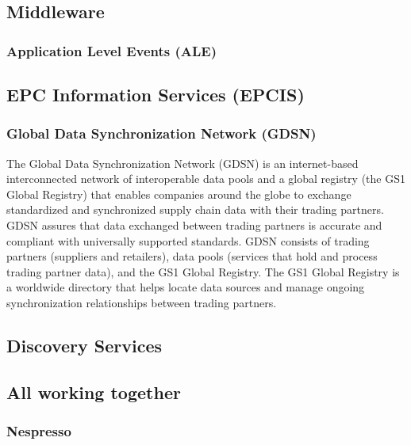 




\subsection{Middleware}

\subsubsection{Application Level Events (ALE)}

\subsection{EPC Information Services (EPCIS)}

\subsubsection{Global Data Synchronization Network (GDSN)}

The Global Data Synchronization Network (GDSN) is an internet-based
interconnected network of interoperable data pools and a global registry (the GS1 Global Registry) that enables companies around the globe to exchange standardized and synchronized supply chain data with their trading partners. GDSN assures that data exchanged between trading partners is accurate and compliant with universally supported standards. GDSN consists of trading partners (suppliers and retailers), data pools (services that hold and process trading partner data), and the GS1 Global Registry. The GS1 Global Registry is a worldwide directory that helps locate data sources and manage ongoing synchronization relationships between trading partners. 

\subsection{Discovery Services}

\subsection{All working together}

\subsubsection{Nespresso}



